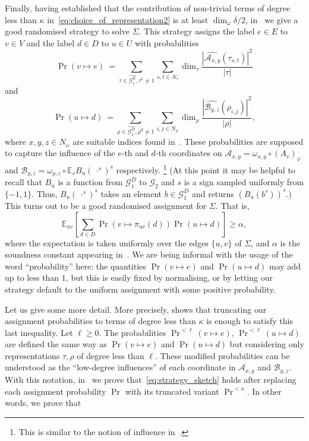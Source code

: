 \documentclass[a4paper,11pt]{article}
\theoremstyle{definition}
\newcommand{\ex}[1]{\mathbb{E}_{#1}}
\newcommand{\gr}{\mathscr{G}}
\newcommand{\A}{\mathcal{A}}
\newcommand{\B}{\mathcal{B}}
\begin{document}
Finally, having established that the contribution of non-trivial terms of degree less than $\kappa$ in~\eqref{eq:choice_of_representation2} is at least $\dim_\omega\delta/2$,  in~ we give a good randomised strategy to solve $\Sigma$. This strategy assigns the label $e\in E$ 
to $v\in V$ and the label $d\in D$ to $u\in U$ with probabilities
\begin{equation*}
\Pr(v\mapsto e) \ = 
\sum_{\tau \in \widehat{\gr_1^E}, \tau^e\neq 1}
\sum_{s,t\in N_\tau} \dim_\tau\frac{\left\vert \widehat{\A_{x,y}}(\tau_{s,t})\right\vert^2}{|\tau|}
\end{equation*}
and
\begin{equation*}
\Pr(u \mapsto d)\ = 
\sum_{\rho \in \widehat{\gr_1^D}, \rho^d\neq 1}
\sum_{i,j\in N_\rho} \dim_\rho \frac{\left\vert \widehat{\B_{y,z}}(\rho_{i,j})\right\vert^2}{|\rho|},
\end{equation*}
where $x,y,z\in N_\omega$ are suitable indices found in~. 
These probabilities are supposed to capture the influence of the $e$-th and
$d$-th coordinates on $\A_{x,y}= \omega_{x,y}\circ (A_v)_\varphi$ and
$\B_{y,z}=\omega_{y,z}\circ \ex{s}B_u( \ \cdot^s)^s$ respectively.
\footnote{This is similar to the notion of influence
in~\cite{Bhangale21:stoc,Austrin09:cc}.}
(At this point it may be helpful to recall that $B_u$ is a function from
$\gr_1^D$ to $\gr_2$ and $s$ is a sign sampled uniformly from $\{-1,1\}$. Thus,
$B_u(\ \cdot^s)^s$ takes an element $b\in\gr_1^D$ and returns $(B_u(b^s))^s$.)
%
This turns out to be a good randomised assignment for $\Sigma$. That is, 
\begin{equation}
\label{eq:strategy_sketch}
\ex{uv}\left[
\sum_{d\in D}
\Pr(v\mapsto \pi_{uv}(d)) \Pr(u\mapsto d)
\right] \geq \alpha,
\end{equation}
where the expectation is taken uniformly over the edges $\{u,v\}$ of $\Sigma$, and $\alpha$ is the soundness constant appearing in~. We are being informal with the usage of the word ``probability'' here: the quantities $\Pr(v\mapsto e)$ and
$\Pr(u \mapsto d)$ may add up to less than $1$, but this is easily fixed by normalising, or by letting our strategy default to the uniform assignment with some positive probability. \par
Let us give some more detail. More precisely,  shows that truncating our assignment probabilities to terms of degree less than $\kappa$ is enough to satisfy this last inequality. Let $\ell\geq 0$. The probabilities $\Pr^{<\ell}(v\mapsto e)$, $\Pr^{<\ell}(u\mapsto d)$ are defined the same way as $\Pr(v\mapsto e)$ and $\Pr(u\mapsto d)$
but considering only representations $\tau, \rho$
of degree less than $\ell$. These modified probabilities can be understood as the ``low-degree influences'' of each coordinate in $\A_{x,y}$ and $\B_{y,z}$. With this notation, in~ we prove that~\eqref{eq:strategy_sketch} holds after replacing 
each assignment probability $\Pr$ with its truncated variant $\Pr^{<\kappa}$. In other words, we prove that
\end{document}
